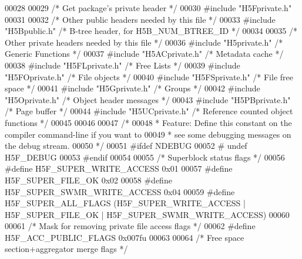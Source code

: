 \begin{DoxyCode}
00028 
00029 \textcolor{comment}{/* Get package's private header */}
00030 \textcolor{preprocessor}{#include "H5Fprivate.h"}
00031 
00032 \textcolor{comment}{/* Other public headers needed by this file */}
00033 \textcolor{preprocessor}{#include "H5Bpublic.h"}          \textcolor{comment}{/* B-tree header, for H5B\_NUM\_BTREE\_ID */}
00034 
00035 \textcolor{comment}{/* Other private headers needed by this file */}
00036 \textcolor{preprocessor}{#include "H5private.h"}      \textcolor{comment}{/* Generic Functions            */}
00037 \textcolor{preprocessor}{#include "H5ACprivate.h"}        \textcolor{comment}{/* Metadata cache                       */}
00038 \textcolor{preprocessor}{#include "H5FLprivate.h"}    \textcolor{comment}{/* Free Lists                           */}
00039 \textcolor{preprocessor}{#include "H5FOprivate.h"}        \textcolor{comment}{/* File objects                         */}
00040 \textcolor{preprocessor}{#include "H5FSprivate.h"}    \textcolor{comment}{/* File free space                      */}
00041 \textcolor{preprocessor}{#include "H5Gprivate.h"}     \textcolor{comment}{/* Groups               */}
00042 \textcolor{preprocessor}{#include "H5Oprivate.h"}         \textcolor{comment}{/* Object header messages               */}
00043 \textcolor{preprocessor}{#include "H5PBprivate.h"}        \textcolor{comment}{/* Page buffer                          */}
00044 \textcolor{preprocessor}{#include "H5UCprivate.h"}    \textcolor{comment}{/* Reference counted object functions   */}
00045 
00046 
00047 \textcolor{comment}{/*}
00048 \textcolor{comment}{ * Feature: Define this constant on the compiler command-line if you want to}
00049 \textcolor{comment}{ *      see some debugging messages on the debug stream.}
00050 \textcolor{comment}{ */}
00051 \textcolor{preprocessor}{#ifdef NDEBUG}
00052 \textcolor{preprocessor}{#  undef H5F\_DEBUG}
00053 \textcolor{preprocessor}{#endif}
00054 
00055 \textcolor{comment}{/* Superblock status flags */}
00056 \textcolor{preprocessor}{#define H5F\_SUPER\_WRITE\_ACCESS          0x01}
00057 \textcolor{preprocessor}{#define H5F\_SUPER\_FILE\_OK               0x02}
00058 \textcolor{preprocessor}{#define H5F\_SUPER\_SWMR\_WRITE\_ACCESS     0x04}
00059 \textcolor{preprocessor}{#define H5F\_SUPER\_ALL\_FLAGS             (H5F\_SUPER\_WRITE\_ACCESS | H5F\_SUPER\_FILE\_OK |
       H5F\_SUPER\_SWMR\_WRITE\_ACCESS)}
00060 
00061 \textcolor{comment}{/* Mask for removing private file access flags */}
00062 \textcolor{preprocessor}{#define H5F\_ACC\_PUBLIC\_FLAGS            0x007fu}
00063 
00064 \textcolor{comment}{/* Free space section+aggregator merge flags */}

\end{DoxyCode}
